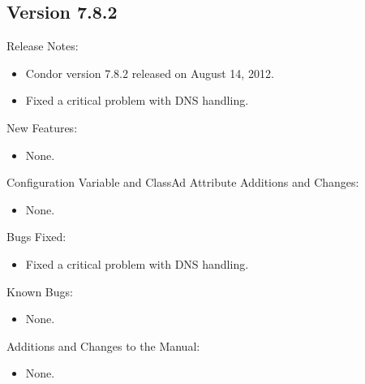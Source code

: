 \subsection*{\label{sec:New-7-8-2}Version 7.8.2}

\noindent Release Notes:

\begin{itemize}

\item Condor version 7.8.2 released on August 14, 2012.

\item \Security Fixed a critical problem with DNS handling.

\end{itemize}

\noindent New Features:

\begin{itemize}

\item None.

\end{itemize}

\noindent Configuration Variable and ClassAd Attribute Additions and Changes:

\begin{itemize}

\item None.

\end{itemize}

\noindent Bugs Fixed:

\begin{itemize}

\item \Security Fixed a critical problem with DNS handling.

\end{itemize}

\noindent Known Bugs:

\begin{itemize}

\item None.

\end{itemize}

\noindent Additions and Changes to the Manual:

\begin{itemize}

\item None.

\end{itemize}

